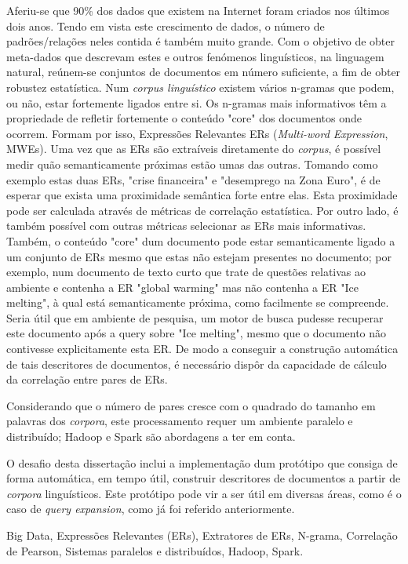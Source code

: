 Aferiu-se que 90\% dos dados que existem na Internet foram criados nos últimos dois anos. Tendo em vista este crescimento de dados, o número de padrões/relações neles contida é também muito grande. Com o objetivo de obter meta-dados que descrevam estes e outros fenómenos linguísticos, na linguagem natural, reúnem-se conjuntos de documentos em número suficiente, a fim de obter robustez estatística. Num \textit{corpus linguístico} existem vários n-gramas que podem, ou não, estar fortemente ligados entre si. Os n-gramas mais informativos têm a propriedade de refletir fortemente o conteúdo "core" \thinspace dos documentos onde ocorrem. Formam por isso, Expressões Relevantes ERs (\textit{Multi-word Expression}, MWEs). Uma vez que as ERs são extraíveis diretamente do \textit{corpus}, é possível medir quão semanticamente próximas estão umas das outras. Tomando como exemplo estas duas ERs, "crise financeira" \thinspace e "desemprego na Zona Euro", é de esperar que exista uma proximidade semântica forte entre elas. Esta proximidade pode ser calculada através de métricas de correlação estatística. Por outro lado, é também possível com outras métricas selecionar as ERs mais informativas. Também, o conteúdo "core" \thinspace dum documento pode estar semanticamente ligado a um conjunto de ERs mesmo que estas não estejam presentes no documento; por exemplo, num documento de texto curto que trate de questões relativas ao ambiente e contenha a ER "global warming" \thinspace mas não contenha a ER "Ice melting", à qual está semanticamente próxima, como facilmente se compreende. Seria útil que em ambiente de pesquisa, um motor de busca pudesse recuperar este documento após a query sobre "Ice melting", mesmo que o documento não contivesse explicitamente esta ER. De modo a conseguir a construção automática de tais descritores de documentos, é necessário dispôr da capacidade de cálculo da correlação entre pares de ERs.

Considerando que o número de pares cresce com o quadrado do tamanho em palavras dos \textit{corpora}, este processamento requer um ambiente paralelo e distribuído; Hadoop e Spark são abordagens a ter em conta.

O desafio desta dissertação inclui a implementação dum protótipo que consiga de forma automática, em tempo útil, construir descritores de documentos a partir de \textit{corpora} linguísticos. Este protótipo pode vir a ser útil em diversas áreas, como é o caso de \textit{query expansion}, como já foi referido anteriormente. 


\begin{keywords}
Big Data, Expressões Relevantes (ERs), Extratores de ERs, N-grama, Correlação de Pearson, Sistemas paralelos e distribuídos, Hadoop, Spark.
\end{keywords}